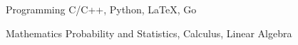 


\begin{cvskills}


\cvskill
{Programming} %
{C/C++, Python, LaTeX, Go} %


\cvskill
{Mathematics} %
{Probability and Statistics, Calculus, Linear Algebra} %


\end{cvskills}